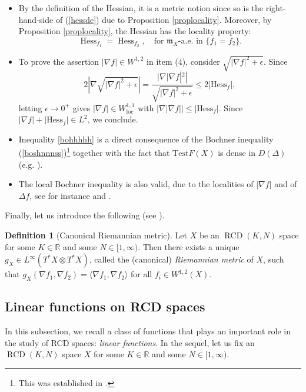 \documentclass[11pt,reqno]{amsart}
\theoremstyle{definition}
\newtheorem{definition}[theorem]{Definition}
\numberwithin{equation}{section}
\newcommand{\meas}{\mathfrak{m}}
\DeclareMathOperator{\Hess}{Hess}
\DeclareMathOperator{\loc}{loc}
\DeclareMathOperator{\RCD}{RCD}
\begin{document}
\begin{itemize}
    \item By the definition of the Hessian, it is a metric notion since so is the right-hand-side of (\ref{hessde}) due to Proposition \ref{proplocality}. Moreover, by Proposition \ref{proplocality}, the Hessian has the locality property:
    \begin{equation}\label{localityhess}
        \Hess_{f_1}=\Hess_{f_2},\quad \text{for $\meas_X$-a.e. in $\{f_1=f_2\}$.}
    \end{equation}
    \item To prove the assertion $|\nabla f| \in W^{1,2}$ in item (4), consider $\sqrt{|\nabla f|^2+\epsilon}$. Since $$2|\nabla \sqrt{|\nabla f|^2+\epsilon}|=\frac{|\nabla |\nabla f|^2|}{\sqrt{|\nabla f|^2+\epsilon}}\le 2|\mathrm{Hess}_f|,$$   letting $\epsilon \to 0^+$ gives $|\nabla f| \in W^{1,1}_{\loc}$ with $|\nabla|\nabla f|| \le |\mathrm{Hess}_f|$. Since $|\nabla f|+|\mathrm{Hess}_f| \in L^2$, we conclude.
    \item Inequality \eqref{bohhhhh} is a direct consequence of the Bochner inequality (\ref{boshnnnss})\footnote{This was established in \cite[Theorem 3.3.8]{Gigli1}.} together with the fact that $\mathrm{Test}F(X)$ is dense in $D(\Delta)$ (e.g. \cite[Lemma 2.2]{H}).
    \item The local Bochner inequality is also valid, due to the localities of $|\nabla f|$ and of $\Delta f$, see for instance \cite[Section 6.2]{AMSbe}  and \cite[Corollary 3.6]{ZZ}.
\end{itemize}
Finally, let us introduce the following (see \cite{AHPT, BGHZ}).
\begin{definition}[Canonical Riemannian metric]
    Let $X$ be an $\RCD(K, N)$ space for some $K \in \mathbb{R}$ and some $N \in [1, \infty)$. Then there exists a unique $g_X \in L^{\infty}(T^*X\otimes T^*X)$, called the (canonical) \textit{Riemannian metric} of $X$, such that 
    $
        g_X(\nabla f_1, \nabla f_2)=\langle \nabla f_1, \nabla f_2\rangle$ for all $f_i \in W^{1,2}(X)$.
\end{definition}

\subsection{Linear functions on RCD spaces}

In this subsection, we recall a class of functions that plays an important role in the study of RCD spaces: {\it linear functions}. In the sequel, let us fix an $\RCD(K, N)$ space $X$ for some $K \in \mathbb{R}$ and some $N \in [1, \infty)$.
\end{document}
